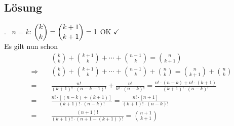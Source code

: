 \documentclass[a4paper,12pt]{article}
\begin{document}
\subsection*{L\"{o}sung}

. \  $n=k$: \qquad $\dbinom{k}{k} = \dbinom{k+1}{k+1} = 1 $ \qquad OK $\checkmark $\\
Es gilt nun schon
\begin{equation*}%
  \begin{split}
                    &\binom{k}{k} + \binom{k+1}{k} + \dotsb + \binom{n-1}{k} = \binom{n}{k+1}\\[0.3cm]
  \Rightarrow \quad &\binom{k}{k} + \binom{k+1}{k} + \dotsb + \binom{n-1}{k} + \binom{n}{k}
                  = \binom{n}{k+1} + \binom{n}{k}\\[0.3cm]
                  = &\frac{n!}{(k+1)!\cdot (n-k-1)!} +\frac{n!}{k!\cdot (n-k)!}
                  =\frac{n!\cdot (n-k) + n!\cdot (k+1)}{(k+1)!\cdot (n-k)!}\\[0.3cm]
                  = &\frac{n!\cdot[(n-k) + (k+1)]}{(k+1)!\cdot (n-k)!}
                  = \frac{n!\cdot[n+1]}{(k+1)!\cdot (n-k)!}\\[0.3cm]
                  = &\frac{(n+1)!}{(k+1)!\cdot (n+1-(k+1))!} = \binom{n+1}{k+1}
  \end{split}
\end{equation*}

%
\end{document}
